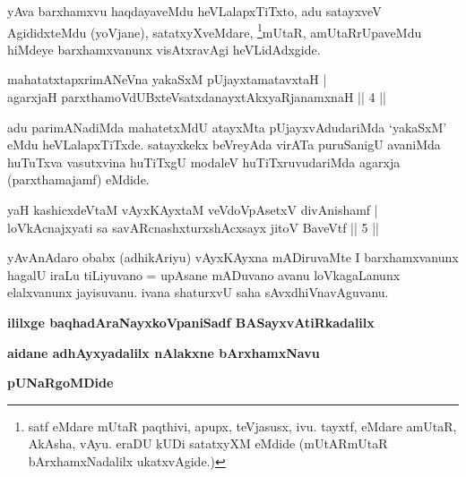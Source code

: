 \begin{artha}
yAva barxhamxvu haqdayaveMdu heVLalapxTiTxto, adu satayxveV AgididxteMdu (yoVjane), satatxyXveMdare, \footnote{satf eMdare mUtaR paqthivi, apupx, teVjasusx, ivu. tayxtf, eMdare amUtaR, AkAsha, vAyu. eraDU kUDi satatxyXM eMdide (mUtARmUtaR bArxhamxNadalilx ukatxvAgide.)}mUtaR, amUtaRrUpaveMdu hiMdeye barxhamxvanunx visAtxravAgi heVLidAdxgide.
\end{artha}

\begin{shl}
mahatatxtapxrimANeVna yakaSxM pUjayxtamatavxtaH | \\
agarxjaH parxthamoVdUBxteVsatxdanayxtAkxyaRjanamxnaH \hfill ||  4 || 
\end{shl}

\begin{artha}
adu parimANadiMda mahatetxMdU atayxMta pUjayxvAdudariMda `yakaSxM' eMdu heVLalapxTiTxde. satayxkekx beVreyAda virATa puruSanigU avaniMda huTuTxva vasutxvina huTiTxgU modaleV huTiTxruvudariMda agarxja (parxthamajamf) eMdide.
\end{artha}


\begin{shl}
yaH kashicxdeVtaM vAyxKAyxtaM veVdoVpAsetxV divAnishamf | \\
loVkAcnajxyati sa savARcnashxturxshAcxsayx jitoV BaveVtf \hfill ||  5 ||
\end{shl}

\begin{artha}
yAvAnAdaro obabx (adhikAriyu) vAyxKAyxna mADiruvaMte I barxhamxvanunx hagalU iraLu tiLiyuvano = upAsane mADuvano avanu loVkagaLanunx elalxvanunx jayisuvanu. ivana shaturxvU saha sAvxdhiVnavAguvanu.
\end{artha}




\begin{center}
{\bf ililxge baqhadAraNayxkoVpaniSadf BASayxvAtiRkadalilx}
\smallskip

{\bf aidane adhAyxyadalilx nAlakxne bArxhamxNavu}
\smallskip

{\bf pUNaRgoMDide}
\end{center}
